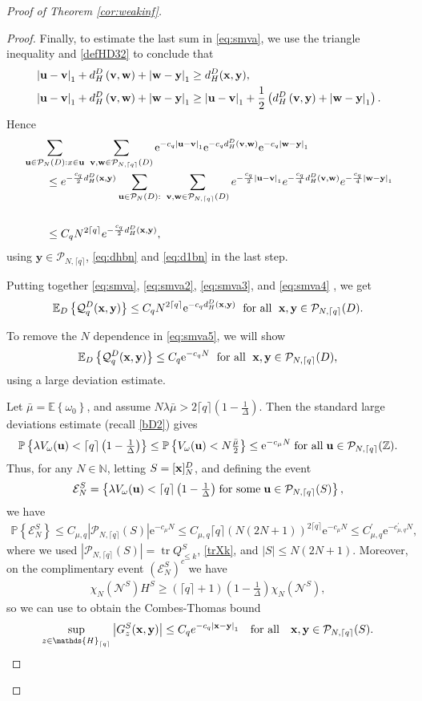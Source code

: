 \documentclass[12pt, a4paper,reqno]{amsart}
\numberwithin{equation}{section}
\DeclareMathOperator{\tr}{tr}
\newcommand\N{\mathbb N}
\newcommand\Z{\mathbb Z}
\newcommand\x{\mathbf{x}}
\newcommand\y{\mathbf{y}}
\newcommand\e{\mathrm{e}}
\renewcommand\P{\mathbb P}
\newcommand\E{\mathbb E}
\newcommand\cE{\mathcal{E}}
\newcommand\cQ{\mathcal{Q}}
\newcommand\cP{\mathcal{P}}
\newcommand{\pr}{\prime}
\newcommand\be{\begin{equation}\begin{aligned}}
\newcommand\ee{\end{aligned}\end{equation}}
\newcommand{\abs}[1]{\left\lvert #1 \right\rvert}
\newcommand{\set}[1]{\left\{ #1 \right\}}
\newcommand{\pa}[1]{\left( #1 \right)}
\newcommand{\cl}[1]{\lceil #1 \rceil}
\newcommand{\eq}[1]{\eqref{#1}}
\newcommand{\qtx}[1]{\quad\text{#1}\quad}
\newcommand{\mqtx}[1]{\; \ \text{#1}\; \  }
\newcommand{\sqtx}[1]{\;\text{#1}\;}
\newcommand{\tfd}{\pa{1- \tfrac{1}{\Delta}}}
\newcommand{\clq}{\cl{q}}
\begin{document}
\begin{proof}[Proof of  Theorem \ref{cor:weakinf}]
\begin{proof}
Finally, to estimate the last sum in \eqref{eq:smva}, we use  the triangle inequality  and \eq{defHD32} to conclude that 
\be
&\abs{{\bf u}-{\bf v}}_1+d_H^D\pa{{\bf v},{\bf w}}+\abs{{\bf w}-{\bf y}}_1\ge d_{H}^D({\bf x},{\bf y}),\\
&\abs{{\bf u}-{\bf v}}_1+d_H^D\pa{{\bf v},{\bf w}}+\abs{{\bf w}-{\bf y}}_1\ge\abs{{\bf u}-{\bf v}}_1+ \frac12\pa{d_H^D\pa{{\bf v},{\bf y}}+\abs{{\bf w}-{\bf y}}_1}.
\ee
Hence
\be\label{eq:smva4}
& \sum_{{\bf u}\in \cP_N(D): x\in {\bf u}}\ \sum_{{\bf v},{\bf w}\in \cP_{N,\cl{q}}(D)}\e^{-c_q\abs{{\bf u}-{\bf v}}_1}\e^{-c_qd^D_H\pa{{\bf v},{\bf w}}}\e^{-c_q\abs{{\bf w}-{\bf y}}_1}\\ 
& \qquad \le e^{-\frac  {c_q}2d_{H}^D({\bf x}, {\bf y})}\sum_{{\bf u}\in \cP_N(D):}\ \sum_{{\bf v},{\bf w}\in \cP_{N,\cl{q}}(D)}e^{-\frac  {c_q}2\abs{{\bf u}-{\bf v}}_1}e^{-\frac  {c_q}4d_H^D\pa{{\bf v},{\bf w}}}e^{-\frac {c_q}4\abs{{\bf w}-{\bf y}}_1}\\
\\& \qquad \le C_q N^{2\cl{q}}e^{-\frac  {c_q}2d_{H}^D({\bf x}, {\bf y})},
\ee
using $\y\in \cP_{N,\cl{q}}$,   \eqref{eq:dhbn} and \eqref{eq:d1bn}  in the last step. 

  Putting together \eqref{eq:smva}, \eqref{eq:smva2}, \eqref{eq:smva3}, and  \eqref{eq:smva4} , we get
\be \label{eq:smva5}
\E_{D}\set{\cQ_q^D ({\bf x},{\bf y})}\le  C_q N^{2\cl{q}}\e^{-c_q d_{H}^D({\bf x},{\bf y})}  \mqtx{for all}\x,\y\in \cP_{N,\clq}(D).
\ee


 To remove the $N$ dependence in \eqref{eq:smva5}, we will show
\be\label{eq:almost1}
\E_{D}\set{\cQ_q^D({\bf x},{\bf y})}\le C_q \e^{-c_q N}\mqtx{for all}\x,\y\in \cP_{N,\clq}(D),
\ee
using  a large deviation estimate.

 Let $\bar{\mu}= \E \set{\omega_0}$, and assume $N \lambda \bar{\mu} > 2 \clq\tfd$.  Then the standard large deviations estimate (recall \eqref{bD2})
gives
\be
\P\set{  \lambda V_\omega ({\bf u})< \clq \tfd}\le \P\set{V_\omega ({\bf u})< N \tfrac {\bar{\mu}} 2}\le \e^{- c_\mu N}\sqtx{for all} {\bf u}\in \cP_{N,\clq}(\Z).
\ee
Thus,  for any $N\in \N$,   letting $S=[{\bf x}]^D_N$, and defining the event
\be\label{eventENS}
\cE^S_N= \set{ \lambda  V_\omega ({\bf u})< {\clq\tfd} \sqtx{for some} {\bf u} \in  \cP_{N,\cl{q}}(S)},
\ee
 we have 
  \begin{align}\label{PV<}
 \P\set{\cE^S_N} \le  C_{\mu,q}  \abs{\cP_{N,\cl{q}}(S)} \e^{- c_\mu N} \le C_{\mu,q} \clq \pa{N(2N+1)}^{2\clq } \e^{- c_\mu N} \le C_{\mu,q}^\pr \e^{- c_{\mu,q}^\pr N},
  \end{align}
  where we used $\abs{\cP_{N,\cl{q}}(S)}=\tr Q_{\le k}^{S}$, \eq{trXk}, and $\abs{S}\le N (2N+1)$.   Moreover,
  on the  complimentary event   $\pa{\cE_N^S}^c $ we have
    \be\label{PVP}
\chi_N(\mathcal N^S)H^S\ge (\clq+1)\tfd\chi_N(\mathcal N^S) ,
  \ee
  so we can use \cite[Proposition 4.1]{EKS1} to obtain  the Combes-Thomas bound 
\be\label{eq:CTkS}
\sup_{z\in \mathds{H}_{\clq}}\abs{ G^S_{z}({\bf x},{\bf y})}\le C_q e^{-c_q\abs{{\bf x}-{\bf y}}_1} \qtx{for all} \x,\y\in \cP_{N,\cl{q}}(S).
\ee



\end{proof}
\end{proof}
\end{document}
